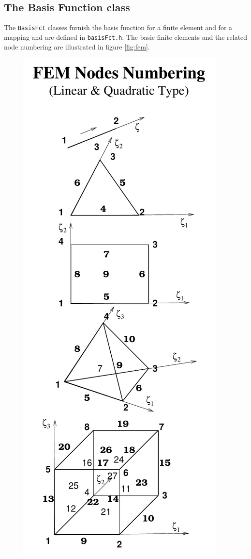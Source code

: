\subsection{The Basis Function class}
The \texttt{BasisFct} classes furnish the basis function for a finite
element and for a mapping and are defined in \texttt{basisFct.h}.  The
basic finite elements and the related node numbering are illustrated
in figure \ref{fig:fem}.
\begin{figure}[bp]
\begin{center}
\includegraphics[height=.75\textheight]{Fem_nodes}

\end{center}
\end{figure}
